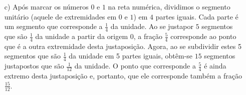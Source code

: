 \begin{multicols}{2}
\begin{solucao}{}{}
\begin{enumerate} [\quad a)]
\begin{center}
          \end{center}


\end{enumerate} %
%
\begin{enumerate}[a)]

    \item[c)] Após marcar os números       $0$       e       $1$       na reta
numérica, dividimos o segmento unitário (aquele de extremidades em       $0$
  e       $1$) em       $4$       partes iguais. Cada parte é um segmento que
corresponde a       $\frac{1}{4}$       da unidade. Ao se justapor       $5$
  segmentos que são       $\frac{1}{4}$       da unidade a partir da origem 0, a
fração       $\frac{5}{4}$       corresponde ao ponto que é a outra extremidade
desta justaposição. Agora, ao se subdividir estes 5 segmentos que são
$\frac{1}{4}$       da unidade em 5 partes iguais, obtêm-se       $15$
segmentos justapostos que são       $\frac{1}{12}$       da unidade. O ponto que
corresponde a       $\frac{5}{4}$       é ainda extremo desta justaposição e,
portanto, que ele corresponde também a fração       $\frac{15}{12}$.



\begin{center}

\end{center}
\end{enumerate}
\end{solucao}
\end{multicols}
